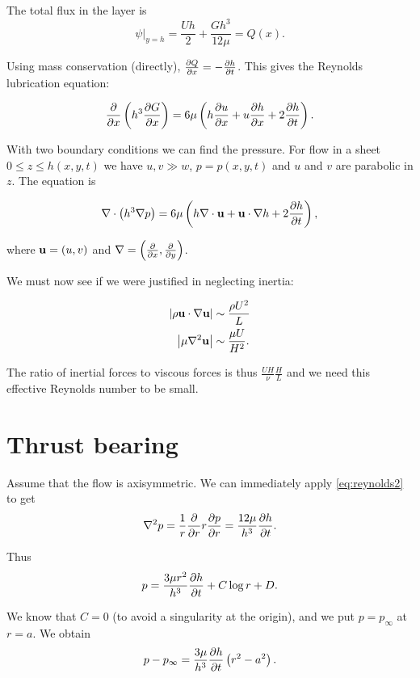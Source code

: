 \documentclass{notes}
\theoremstyle{plain}
\begin{document}
The total flux in the layer is 
\[
\left.\psi\right|_{y = h} = \frac{U h}{2} + \frac{G h^3}{12 \mu} = Q(x).
\]

Using mass conservation (directly), $\frac{\partial Q}{\partial x} = - \frac{\partial h}{\partial t}$.  This
gives the Reynolds lubrication equation:

\begin{equation}\label{eq:reynolds}
\frac{\partial }{\partial x} \left( h^3 \frac{\partial G}{\partial x}\right) = 6 \mu \left( h \frac{\partial u}{\partial x}
+ u \frac{\partial h}{\partial x} + 2 \frac{\partial h}{\partial t}\right).
\end{equation}

With two boundary conditions we can find the pressure. For flow in
a sheet $0 \le z \le h(x,y,t)$ we have $u,v \gg w$, $p = p(x,y,t)$
and $u$ and $v$ are parabolic in $z$.  The equation is

\begin{equation}\label{eq:reynolds2}
\nabla \cdot \left( h^3 \nabla p \right) = 6 \mu \left(
h \nabla \cdot \mathbf{u} + \mathbf{u} \cdot \nabla h + 2 \frac{\partial h}{\partial t}
\right),
\end{equation}

where $\mathbf{u} = (u,v)$ and $\nabla = \left( \frac{\partial }{\partial x}, \frac{\partial }{\partial y}\right)$.

We must now see if we were justified in neglecting inertia:

\begin{align*}
\left| \rho \mathbf{u} \cdot \nabla \mathbf{u} \right| & \sim \frac{\rho U^2}{L} \\
\left|\mu \nabla^2 \mathbf{u}\right| & \sim \frac{\mu U}{H^2}.
\end{align*}

The ratio of inertial forces to viscous forces is thus
$\frac{U H}{\nu} \frac{H}{L}$ and we need this effective Reynolds number
to be small.

\section{Thrust bearing}

\vspace{1in}

Assume that the flow is axisymmetric.  We can immediately apply
\eqref{eq:reynolds2} to get
\[
\nabla^2 p = \frac{1}{r} \frac{\partial }{\partial r} r \frac{\partial p}{\partial r} = \frac{12 \mu}{h^3} \frac{\partial h}{\partial t}.
\]

Thus
\[
p = \frac{3 \mu r^2}{h^3} \frac{\partial h}{\partial t} + C \log r + D.
\]

We know that $C = 0$ (to avoid a singularity at the origin), and we put
$p = p_\infty$ at $r = a$.  We obtain
\[
p - p_\infty = \frac{3 \mu}{h^3} \frac{\partial h}{\partial t} \left( r^2 - a^2 \right).
\]
\end{document}
